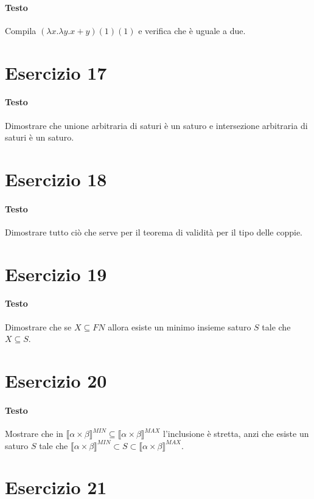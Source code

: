 \documentclass[a4paper,10pt]{article}
\begin{document}
\paragraph{Testo}
Compila $(\lambda x.\lambda y. x+y)(1)(1)$ e verifica che è uguale a due.

\section*{Esercizio 17}
\paragraph{Testo}
Dimostrare che unione arbitraria di saturi è un saturo e intersezione arbitraria di saturi è un saturo.

\section*{Esercizio 18}
\paragraph{Testo}
Dimostrare tutto ciò che serve per il teorema di validità per il tipo delle coppie.

\section*{Esercizio 19}
\paragraph{Testo}
Dimostrare che se $X \subseteq F N$ allora esiste un minimo insieme saturo $S$ tale che $X \subseteq S$.

\section*{Esercizio 20}
\paragraph{Testo}
Mostrare che in $\llbracket \alpha \times \beta \rrbracket^{MIN} \subseteq \llbracket \alpha \times \beta \rrbracket^{MAX}$ l’inclusione è stretta, anzi che esiste un saturo $S$ tale che $\llbracket \alpha \times \beta \rrbracket^{MIN} \subset S \subset \llbracket \alpha \times \beta \rrbracket^{MAX}$.

\section*{Esercizio 21}
\end{document}
